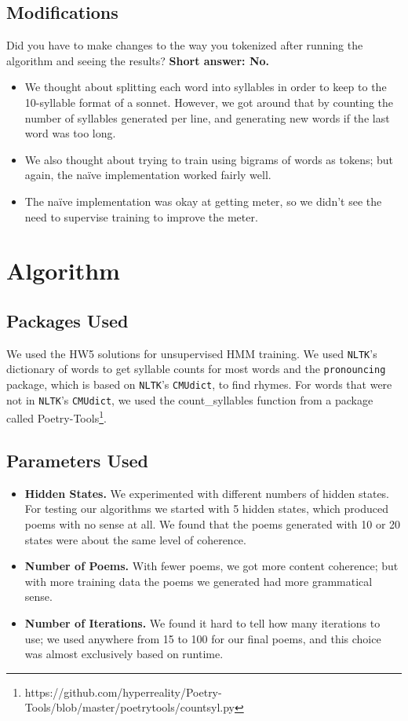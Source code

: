 \subsection{Modifications}
Did you have to make changes to the way you tokenized after running the algorithm and seeing the results? \textbf{Short answer: No.}
\begin{itemize}
	\item We thought about splitting each word into syllables in order to keep to the 10-syllable format of a sonnet. However, we got around that by counting the number of syllables generated per line, and generating new words if the last word was too long.
	\item We also thought about trying to train using bigrams of words as tokens; but again, the na\"ive implementation worked fairly well.
  \item The na\"ive implementation was okay at getting meter, so we didn't see the need to supervise training to improve the meter.
\end{itemize}


\section{Algorithm}
\subsection{Packages Used}
We used the HW5 solutions for unsupervised HMM training. We used {\tt NLTK}'s dictionary of words to get syllable counts for most words and the {\tt pronouncing} package, which is based on {\tt NLTK}'s {\tt CMUdict}, to find rhymes.  For words that were not in {\tt NLTK}'s {\tt CMUdict}, we used the count_syllables function from a package called Poetry-Tools\footnote{https://github.com/hyperreality/Poetry-Tools/blob/master/poetrytools/countsyl.py}.
\subsection{Parameters Used}
\begin{itemize}
\item \textbf{Hidden States.} We experimented with different numbers of hidden states. For testing our algorithms we started with 5 hidden states, which produced poems with no sense at all. We found that the poems generated with 10 or 20 states were about the same level of coherence.
\item \textbf{Number of Poems.} With fewer poems, we got more content coherence; but with more training data the poems we generated had more grammatical sense.
\item \textbf{Number of Iterations.} We found it hard to tell how many iterations to use; we used anywhere from 15 to 100 for our final poems, and this choice was almost exclusively based on runtime.
\end{itemize}



